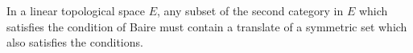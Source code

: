 In a linear topological space $E$, any subset of the second category in $E$ which satisfies the condition of Baire must contain a translate of a symmetric set which also satisfies the conditions.
